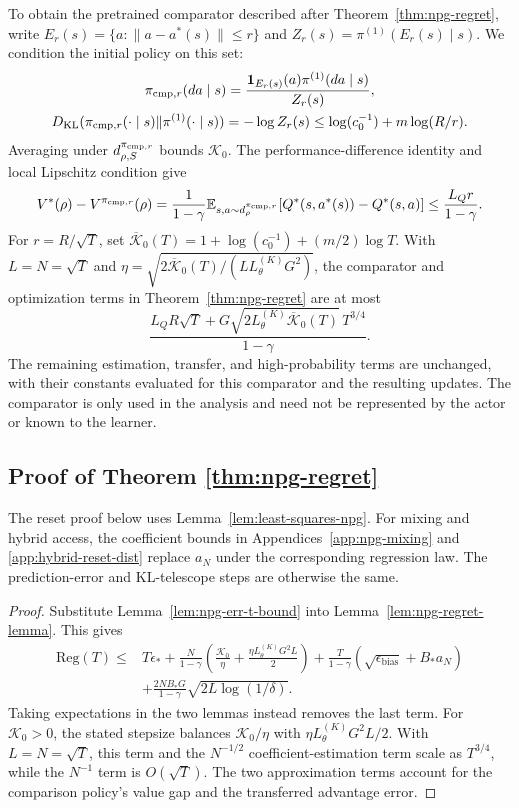 To obtain the pretrained comparator described after Theorem~\ref{thm:npg-regret}, write $E_r(s)=\{a:\|a-a^*(s)\|\leq r\}$ and $Z_r(s)=\pi^{(1)}(E_r(s)\mid s)$. We condition the initial policy on this set:
\[
\begin{gathered}
\pi_{{\rm cmp},r}(da\mid s)
=\frac{\mathbf 1_{E_r(s)}(a)\pi^{(1)}(da\mid s)}{Z_r(s)},\\
D_{\mathrm{KL}}(\pi_{{\rm cmp},r}(\cdot\mid s)\|\pi^{(1)}(\cdot\mid s))
=-\log Z_r(s)
\leq\log(c_0^{-1})+m\log(R/r).
\end{gathered}
\]
Averaging under $d_{\rho,S}^{\pi_{{\rm cmp},r}}$ bounds $\mathcal K_0$. The performance-difference identity and local Lipschitz condition give
\[
V^*(\rho)-V^{\pi_{{\rm cmp},r}}(\rho)
=\frac{1}{1-\gamma}\mathbb{E}_{s,a\sim d_\rho^{\pi_{{\rm cmp},r}}}
[Q^*(s,a^*(s))-Q^*(s,a)]
\leq\frac{L_Qr}{1-\gamma}.
\]
For $r=R/\sqrt T$, set $\overline{\mathcal K}_0(T)=1+\log(c_0^{-1})+(m/2)\log T$. With $L=N=\sqrt T$ and $\eta=\sqrt{2\overline{\mathcal K}_0(T)/(LL_\theta^{(K)}G^2)}$, the comparator and optimization terms in Theorem~\ref{thm:npg-regret} are at most
\[
\frac{L_QR\sqrt T+G\sqrt{2L_\theta^{(K)}\overline{\mathcal K}_0(T)}\,T^{3/4}}{1-\gamma}.
\]
The remaining estimation, transfer, and high-probability terms are unchanged, with their constants evaluated for this comparator and the resulting updates. The comparator is only used in the analysis and need not be represented by the actor or known to the learner.


\subsection{Proof of Theorem \ref{thm:npg-regret}}
The reset proof below uses Lemma~\ref{lem:least-squares-npg}. For mixing and hybrid access, the coefficient bounds in Appendices~\ref{app:npg-mixing} and \ref{app:hybrid-reset-dist} replace $a_N$ under the corresponding regression law. The prediction-error and KL-telescope steps are otherwise the same.
\begin{proof}
Substitute Lemma~\ref{lem:npg-err-t-bound} into
Lemma~\ref{lem:npg-regret-lemma}. This gives
\begin{align}
\mathrm{Reg}(T)\leq{}&T\epsilon_*+
\frac N{1-\gamma}\left(\frac {\mathcal K_0}\eta+
\frac{\eta L_\theta^{(K)}G^2L}{2}\right)
+\frac T{1-\gamma}(\sqrt{\epsilon_{\mathrm{bias}}}+B_*a_N)\nonumber\\
&+\frac{2NB_*G}{1-\gamma}\sqrt{2L\log(1/\delta)}.
\label{eq:ddim-regret-1}
\end{align}
Taking expectations in the two lemmas instead removes the last term.
For $\mathcal K_0>0$, the stated stepsize balances $\mathcal K_0/\eta$ with
$\eta L_\theta^{(K)}G^2L/2$. With $L=N=\sqrt T$, this term and the
$N^{-1/2}$ coefficient-estimation term scale as $T^{3/4}$, while the
$N^{-1}$ term is $O(\sqrt T)$. The two approximation terms account for the
comparison policy's value gap and the transferred advantage error.
\end{proof}

